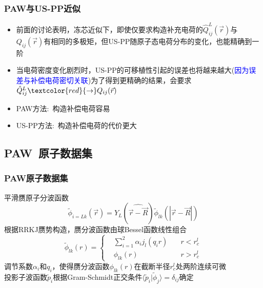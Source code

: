 \frame
{
	\frametitle{\textrm{PAW}与\textrm{US-PP}近似}
	\begin{itemize}
		\item 前面的讨论表明，冻芯近似下，即使仅要求构造补充电荷的$\hat{Q}_{ij}^L(\vec r)$与$Q_{ij}(\vec r)$有相同的多极矩，但\textrm{US-PP}随原子态电荷分布的变化，也能精确到一阶\\
			{\fontsize{6.5pt}{3.9pt}}
		\item 当电荷密度变化剧烈时，\textrm{US-PP}的可移植性引起的误差也将越来越大(\textcolor{blue}{因为误差与补偿电荷密切关联})为了得到更精确的结果，会要求$\hat{Q}_{ij}^L\textcolor{red}{\rightarrow}Q_{ij}(\vec r)$\\
			{\fontsize{6.5pt}{3.9pt}}
	\end{itemize}
	\begin{itemize}
		\item \textrm{PAW}方法:~构造补偿电荷容易
			\vskip 2pt
			{\fontsize{6.5pt}{3.9pt}\selectfont{引入了全电子波函数，保持电荷密度差的精度\\
		通过电荷密度差的多极矩构造补偿电荷\\
		空间上补偿电荷更延展、更平缓}}
		\item \textrm{US-PP}方法:~构造补偿电荷的代价更大
			\vskip 2pt
			{\fontsize{6.5pt}{3.9pt}}
	\end{itemize}

}

\subsection{\rm{PAW~}原子数据集}
\frame
{
	\frametitle{\textrm{PAW}原子数据集}
	平滑赝原子分波函数
	\begin{displaymath}
		\tilde\phi_{i=Lk}(\vec r)=Y_L(\widehat{\vec r-\vec R})\tilde\phi_{lk}(|\vec r-\vec R|)
	\end{displaymath}
	根据\textrm{RRKJ}赝势构造，赝分波函数由球\textrm{Bessel}函数线性组合
	\begin{displaymath}
		\tilde\phi_{lk}(r)=\left\{
		\begin{aligned}
			&\sum_{i=1}^2\alpha_ij_l(q_ir)\quad &r<r_c^l\\
			&\phi_{lk}(r)\quad&r>r_c^l
		\end{aligned}
		\right.
	\end{displaymath}
	调节系数$\alpha_i$和$q_i$，使得赝分波函数$\phi_{lk}(r)$在截断半径$r_c^l$处两阶连续可微\\
	投影子波函数$\tilde p_i$根据\textrm{Gram-Schmidt}正交条件$\langle\tilde p_i|\tilde\phi_j\rangle=\delta_{ij}$确定
}

